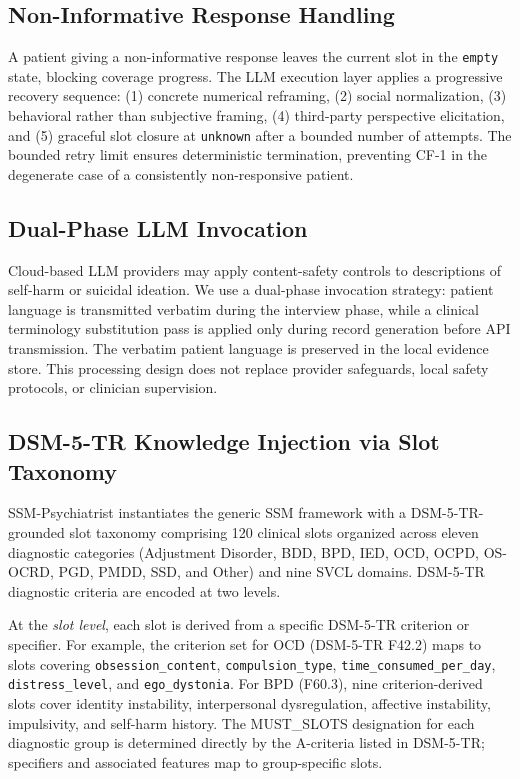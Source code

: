 \documentclass[conference]{IEEEtran}
\begin{document}
\subsection{Non-Informative Response Handling}

A patient giving a non-informative response leaves the current slot in the \texttt{empty} state, blocking coverage progress. The LLM execution layer applies a progressive recovery sequence: (1) concrete numerical reframing, (2) social normalization, (3) behavioral rather than subjective framing, (4) third-party perspective elicitation, and (5) graceful slot closure at \texttt{unknown} after a bounded number of attempts. The bounded retry limit ensures deterministic termination, preventing CF-1 in the degenerate case of a consistently non-responsive patient.

\subsection{Dual-Phase LLM Invocation}

Cloud-based LLM providers may apply content-safety controls to descriptions of self-harm or suicidal ideation. We use a dual-phase invocation strategy: patient language is transmitted verbatim during the interview phase, while a clinical terminology substitution pass is applied only during record generation before API transmission. The verbatim patient language is preserved in the local evidence store. This processing design does not replace provider safeguards, local safety protocols, or clinician supervision.

\subsection{DSM-5-TR Knowledge Injection via Slot Taxonomy}
\label{sec:dsm_injection}

SSM-Psychiatrist instantiates the generic SSM framework with a DSM-5-TR-grounded slot taxonomy comprising 120 clinical slots organized across eleven diagnostic categories (Adjustment Disorder, BDD, BPD, IED, OCD, OCPD, OS-OCRD, PGD, PMDD, SSD, and Other) and nine SVCL domains. DSM-5-TR diagnostic criteria are encoded at two levels.

At the \textit{slot level}, each slot is derived from a specific DSM-5-TR criterion or specifier. For example, the criterion set for OCD (DSM-5-TR F42.2) maps to slots covering \texttt{obsession\_content}, \texttt{compulsion\_type}, \texttt{time\_consumed\_per\_day}, \texttt{distress\_level}, and \texttt{ego\_dystonia}. For BPD (F60.3), nine criterion-derived slots cover identity instability, interpersonal dysregulation, affective instability, impulsivity, and self-harm history. The MUST\_SLOTS designation for each diagnostic group is determined directly by the A-criteria listed in DSM-5-TR; specifiers and associated features map to group-specific slots.
\end{document}
